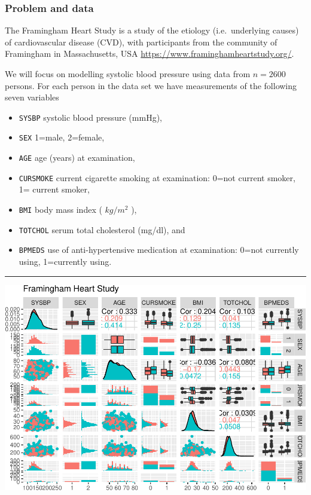 \documentclass[]{article}
\providecommand{\tightlist}{%
  \setlength{\itemsep}{0pt}\setlength{\parskip}{0pt}}
\begin{document}
\hypertarget{problem-and-data}{%
\subsubsection{Problem and data}\label{problem-and-data}}

The Framingham Heart Study is a study of the etiology (i.e.~underlying
causes) of cardiovascular disease (CVD), with participants from the
community of Framingham in Massachusetts, USA
\url{https://www.framinghamheartstudy.org/}.

We will focus on modelling systolic blood pressure using data from
\(n=2600\) persons. For each person in the data set we have measurements
of the following seven variables \footnotesize

\begin{itemize}
\tightlist
\item
  \texttt{SYSBP} systolic blood pressure (mmHg),
\item
  \texttt{SEX} 1=male, 2=female,
\item
  \texttt{AGE} age (years) at examination,
\item
  \texttt{CURSMOKE} current cigarette smoking at examination: 0=not
  current smoker, 1= current smoker,
\item
  \texttt{BMI} body mass index ( \(kg/m^2\) ),
\item
  \texttt{TOTCHOL} serum total cholesterol (mg/dl), and
\item
  \texttt{BPMEDS} use of anti-hypertensive medication at examination:
  0=not currently using, 1=currently using. \normalsize
\end{itemize}

\begin{center}\rule{0.5\linewidth}{\linethickness}\end{center}

\includegraphics{1Intro_files/figure-latex/CVDread-1.pdf}
\end{document}

